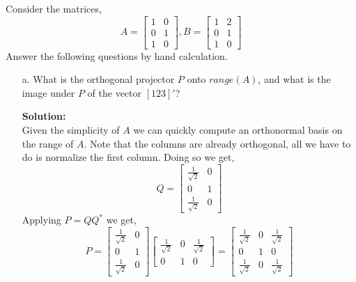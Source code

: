 \documentclass[12pt]{article}
\makeatletter
\theoremstyle{homework}
\newenvironment{exercise}[1]
{\def\@currentlabel{#1}\exercisecore}
{\endexercisecore}
\newcommand{\localhead}[1]{\par\smallskip\noindent\textbf{#1}\nobreak\\}%
\newcommand\solution{\localhead{Solution:}}
\makeatother
\begin{document}
\begin{exercise}{6.4} Consider the matrices, 
  \begin{equation*}
    A = 
    \begin{bmatrix}
      1 & 0\\
      0 & 1\\
      1 & 0
    \end{bmatrix},
    B = 
    \begin{bmatrix}
      1 & 2\\
      0 & 1\\
      1 & 0
    \end{bmatrix}
  \end{equation*}
  Answer the following questions by hand calculation.\\
  \begin{enumerate}
    \item[a.] What is the orthogonal projector $P$ onto $range(A)$, and what is the image under $P$ of the 
    vector $[1 2 3]'$? \\
    \solution Given the simplicity of $A$ we can quickly compute an orthonormal basis on the range of $A$. Note that the columns are already orthogonal, all we have to do 
    is normalize the first column. Doing so we get, 
    \begin{equation*}
      Q = 
      \begin{bmatrix}
        \frac{1}{\sqrt{2}} & 0\\
        0 & 1\\
        \frac{1}{\sqrt{2}} & 0
      \end{bmatrix}
    \end{equation*}
    Applying $P = QQ^*$ we get,
    \begin{equation*}
      P = 
      \begin{bmatrix}
        \frac{1}{\sqrt{2}} & 0\\
        0 & 1\\
        \frac{1}{\sqrt{2}} & 0
      \end{bmatrix}
      \begin{bmatrix}
        \frac{1}{\sqrt{2}} & 0 & \frac{1}{\sqrt{2}}\\
        0 & 1& 0
        \end{bmatrix}
        =
        \begin{bmatrix}
          \frac{1}{\sqrt{2}} & 0 & \frac{1}{\sqrt{2}}\\
          0 & 1 & 0\\
          \frac{1}{\sqrt{2}} & 0& \frac{1}{\sqrt{2}}

\end{bmatrix}
\end{equation*}
\end{enumerate}
\end{exercise}
\end{document}
